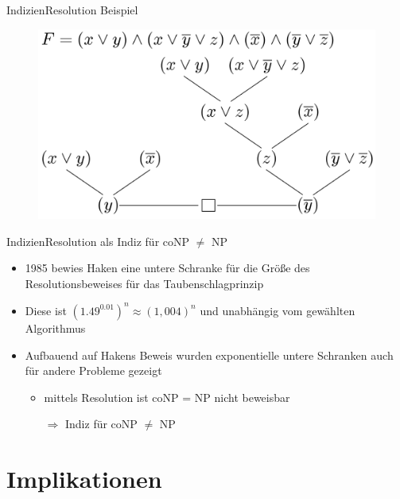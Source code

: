 \documentclass[ignorenonframetext,]{beamer}
\begin{document}
\begin{frame}{Indizien}{Resolution Beispiel}

\begin{figure}[htbp]
\centering
\includegraphics{img/res-beweis.png}
\end{figure}

\end{frame}

\begin{frame}{Indizien}{Resolution als Indiz für coNP $\neq$ NP}

\begin{itemize}
\itemsep1pt\parskip0pt
\item
  1985 bewies Haken eine untere Schranke für die Größe des
  Resolutionsbeweises für das Taubenschlagprinzip
\item
  Diese ist $(1.49^{0.01})^n \approx (1,004)^n$ und unabhängig vom
  gewählten Algorithmus
\item
  Aufbauend auf Hakens Beweis wurden exponentielle untere Schranken auch
  für andere Probleme gezeigt

  \begin{itemize}
  \itemsep1pt\parskip0pt
  \item
    mittels Resolution ist coNP = NP nicht beweisbar
  \item[$\Rightarrow$] Indiz für coNP $\neq$ NP
  \end{itemize}
\end{itemize}

\end{frame}

\section{Implikationen}\label{implikationen}
\end{document}
